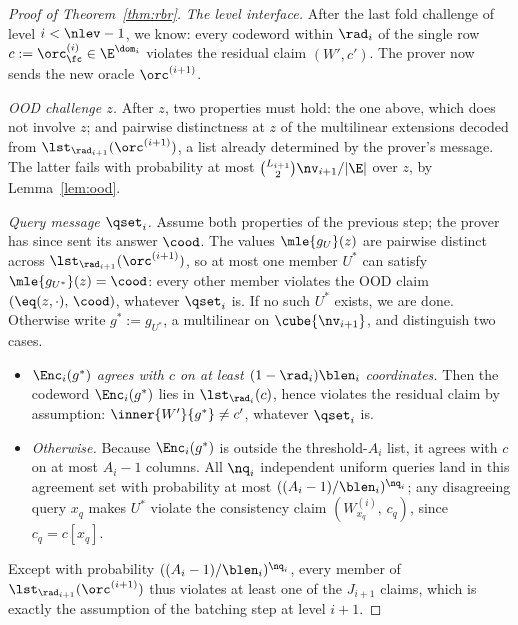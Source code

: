 \begin{proof}[Proof of Theorem~\ref{thm:rbr}]
\medskip\noindent\emph{The level interface.}
After the last fold challenge of level $i < \nlev - 1$, we know: every codeword within $\rad_i$ of the single row $c := \orc^{(i)}_\fc \in \E^{\dom_i}$ violates the residual claim $(W', c')$. The prover now sends the new oracle $\orc^{(i+1)}$.

\medskip\noindent\emph{OOD challenge $z$.}
After $z$, two properties must hold: the one above, which does not involve $z$; and pairwise distinctness at $z$ of the multilinear extensions decoded from $\lst_{\rad_{i+1}}(\orc^{(i+1)})$, a list already determined by the prover's message. The latter fails with probability at most $\binom{L_{i+1}}{2} \nv_{i+1} / |\E|$ over $z$, by Lemma~\ref{lem:ood}.

\medskip\noindent\emph{Query message $\qset_i$.}
Assume both properties of the previous step; the prover has since sent its answer $\cood$. The values $\mle{g_U}(z)$ are pairwise distinct across $\lst_{\rad_{i+1}}(\orc^{(i+1)})$, so at most one member $U^\ast$ can satisfy $\mle{g_{U^\ast}}(z) = \cood$: every other member violates the OOD claim $(\eq(z, \cdot),\, \cood)$, whatever $\qset_i$ is. If no such $U^\ast$ exists, we are done. Otherwise write $g^\ast := g_{U^\ast}$, a multilinear on $\cube{\nv_{i+1}}$, and distinguish two cases.
\begin{itemize}[itemsep=1pt]
\item \emph{$\Enc_i(g^\ast)$ agrees with $c$ on at least $(1 - \rad_i) \blen_i$ coordinates.} Then the codeword $\Enc_i(g^\ast)$ lies in $\lst_{\rad_i}(c)$, hence violates the residual claim by assumption: $\inner{W'}{g^\ast} \neq c'$, whatever $\qset_i$ is.
\item \emph{Otherwise.} Because $\Enc_i(g^\ast)$ is outside the threshold-$A_i$ list, it agrees with $c$ on at most $A_i-1$ columns. All $\nq_i$ independent uniform queries land in this agreement set with probability at most $((A_i-1)/\blen_i)^{\nq_i}$; any disagreeing query $x_q$ makes $U^\ast$ violate the consistency claim $(W^{(i)}_{x_q},\, c_q)$, since $c_q = c[x_q]$.
\end{itemize}
Except with probability $((A_i-1)/\blen_i)^{\nq_i}$, every member of $\lst_{\rad_{i+1}}(\orc^{(i+1)})$ thus violates at least one of the $J_{i+1}$ claims, which is exactly the assumption of the batching step at level $i + 1$.


\end{proof}
